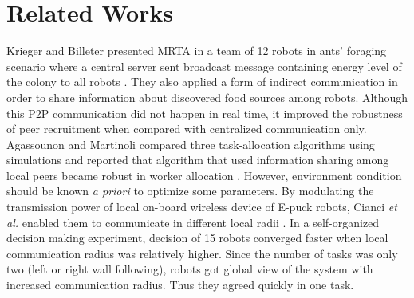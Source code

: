 \documentclass[letterpaper, 10 pt, times, conference]{ieeeconf} %
\begin{document}
\section{Related Works}
\label{sec:bg}
Krieger and Billeter presented MRTA in a team of 12 robots in ants' foraging scenario where a central server sent broadcast message containing energy level of the colony to all robots \cite{Krieger}. They also applied a form of indirect communication in order to share information about discovered food sources among robots. Although this P2P communication did not happen in real time, it improved the robustness of peer recruitment when compared with centralized communication only. Agassounon and Martinoli compared three task-allocation algorithms using simulations and reported that algorithm that used information sharing among local peers became robust in worker allocation \cite{Agassounon}. However, environment condition should be known {\em a priori} to optimize some parameters. By modulating the transmission power of local on-board wireless device of E-puck robots, Cianci {\em et al.} enabled them to communicate in different local radii \cite{Cianci}. In a self-organized decision making experiment, decision of 15 robots converged faster when local communication radius was relatively higher. Since the number of tasks was only two (left or right wall following), robots got global view of the system with increased communication radius. Thus they agreed quickly in one task.
\end{document}
